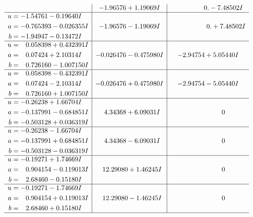 \documentclass[1p]{elsarticle_modified}
\theoremstyle{definition}
\begin{document}
$$\begin{array}{c|c|c}
 & -1.96576 + 1.19069 I & \phantom{-0.000000 } 0. - 7.48502 I \\ \hline\begin{aligned}
u &= -1.54761 - 0.19640 I \\
a &= -0.765393 - 0.026355 I \\
b &= -1.94947 - 0.13472 I\end{aligned}
 & -1.96576 - 1.19069 I & \phantom{-0.000000 -}0. + 7.48502 I \\ \hline\begin{aligned}
u &= \phantom{-}0.058398 + 0.432391 I \\
a &= \phantom{-}0.07424 + 2.10314 I \\
b &= \phantom{-}0.726160 - 1.007150 I\end{aligned}
 & -0.026476 - 0.475980 I & -2.94754 + 5.05440 I \\ \hline\begin{aligned}
u &= \phantom{-}0.058398 - 0.432391 I \\
a &= \phantom{-}0.07424 - 2.10314 I \\
b &= \phantom{-}0.726160 + 1.007150 I\end{aligned}
 & -0.026476 + 0.475980 I & -2.94754 - 5.05440 I \\ \hline\begin{aligned}
u &= -0.26238 + 1.66704 I \\
a &= -0.137991 - 0.684851 I \\
b &= -0.503128 + 0.036319 I\end{aligned}
 & \phantom{-}4.34368 + 6.09031 I & \phantom{-0.000000 } 0 \\ \hline\begin{aligned}
u &= -0.26238 - 1.66704 I \\
a &= -0.137991 + 0.684851 I \\
b &= -0.503128 - 0.036319 I\end{aligned}
 & \phantom{-}4.34368 - 6.09031 I & \phantom{-0.000000 } 0 \\ \hline\begin{aligned}
u &= -0.19271 + 1.74669 I \\
a &= \phantom{-}0.904154 - 0.119013 I \\
b &= \phantom{-}2.68460 - 0.15180 I\end{aligned}
 & \phantom{-}12.29080 + 1.46245 I & \phantom{-0.000000 } 0 \\ \hline\begin{aligned}
u &= -0.19271 - 1.74669 I \\
a &= \phantom{-}0.904154 + 0.119013 I \\
b &= \phantom{-}2.68460 + 0.15180 I\end{aligned}
 & \phantom{-}12.29080 - 1.46245 I & \phantom{-0.000000 } 0\\
 \hline 
 \end{array}$$\newpage
\end{document}
